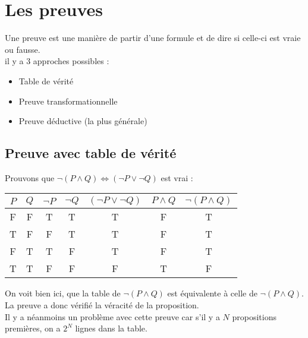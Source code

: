 % 			
% 				
% 	
	\section{Les preuves}
		Une preuve est une manière de partir d’une formule et de dire si celle-ci est vraie ou fausse.\\
		il y a 3 approches possibles :
		\begin{itemize}
			\item Table de vérité
			\item Preuve transformationnelle
			\item Preuve déductive (la plus générale)		
		\end{itemize}
		\subsection{Preuve avec table de vérité}
		Prouvons que $\lnot (P \land Q) \Leftrightarrow (\lnot P \lor \lnot Q)$ est vrai :
			\begin{center}
			\begin{tabular}{cc|ccxcx}
			$P$ & $Q$ & $\lnot P$ & $\lnot Q$ & $(\lnot P \lor \lnot Q)$ & $P \land Q$ & $\lnot (P \land Q)$\\
			\hline
			F&F&T&T&T&F&T\\
			T&F&F&T&T&F&T\\
			F&T&T&F&T&F&T\\
			T&T&F&F&F&T&F\\
			\end{tabular}
			\end{center}
			On voit bien ici, que la table de $\lnot (P \land Q)$ est équivalente à celle de $\lnot (P \land Q)$. La preuve a donc vérifié la véracité de la proposition. \\
			Il y a néanmoins un problème avec cette preuve car s'il y a $N$ propositions premières, on a $2^N$ lignes dans la table.
